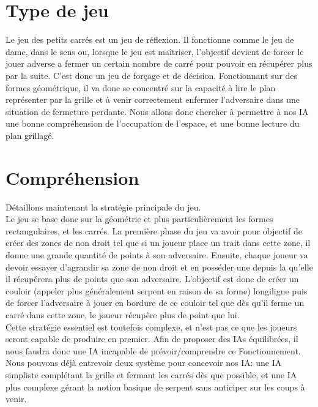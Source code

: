 \documentclass[a4paper,12pt]{report}
\begin{document}
\section{Type de jeu}

Le jeu des petits carr\'es est un jeu de r\'eflexion. Il fonctionne comme le jeu de dame, dans le sens ou, lorsque le jeu est ma\^itriser, l'objectif devient de forcer le jouer adverse a fermer un certain nombre de carr\'e pour pouvoir en r\'ecup\'erer plus par la suite. C'est donc un jeu de for\c{c}age et de d\'ecision. Fonctionnant sur des formes g\'eom\'etrique, il va donc se concentr\'e sur la capacit\'e \`a lire le plan repr\'esenter par la grille et \`a venir correctement enfermer l'adversaire dans une situation de fermeture perdante. Nous allons donc chercher \`a permettre \`a nos IA une bonne compr\'ehension de l'occupation de l'espace, et une bonne lecture du plan grillag\'e.

\section{Compr\'ehension}

D\'etaillons maintenant la strat\'egie principale du jeu.\\
Le jeu se base donc sur la g\'eom\'etrie et plus particuli\`erement les formes rectangulaires, et les carr\'es. La premi\`ere phase du jeu va avoir pour objectif de cr\'eer des zones de \og{}non droit\fg{} tel que si un joueur place un trait dans cette zone, il donne une grande quantit\'e de points \`a son adversaire. Ensuite, chaque joueur va devoir essayer d'agrandir sa zone de non droit et en \og{}poss\'eder\fg{} une depuis la qu'elle il r\'ecup\'erera plus de points que son adversaire. L'objectif est donc de cr\'eer un couloir (appeler plus g\'en\'eralement \og{}serpent\fg{} en raison de sa forme) longiligne puis de forcer l'adversaire \`a jouer en bordure de ce couloir tel que d\`es qu'il ferme un carr\'e dans cette zone, le joueur r\'ecup\`ere plus de point que lui. \\
Cette strat\'egie essentiel est toutefois complexe, et n'est pas ce que les joueurs seront capable de produire en premier. Afin de proposer des IAs \'equilibr\'ees,  il nous faudra donc une IA incapable de pr\'evoir/comprendre ce Fonctionnement. \\
Nous pouvons d\'ej\`a entrevoir deux syst\`eme pour concevoir nos IA: une IA simpliste compl\'etant la grille et fermant les carr\'es d\`es que possible, et une IA plus complexe g\'erant la notion basique de serpent sans anticiper sur les coups \`a venir.
\end{document}
